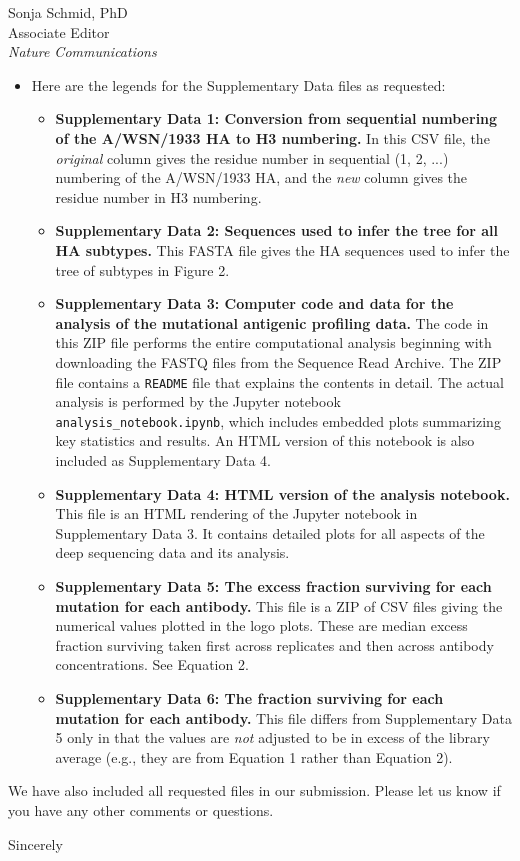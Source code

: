 \documentclass[a4paper,11pt]{letter}
\begin{document}
\begin{letter}{Sonja Schmid, PhD \\ Associate Editor \\ \textit{Nature Communications} }
\begin{itemize}
\item Here are the legends for the Supplementary Data files as requested:

\begin{itemize}

\item {\bf Supplementary Data 1: Conversion from sequential numbering of the A/WSN/1933 HA to H3 numbering.}
In this CSV file, the \emph{original} column gives the residue number in sequential (1, 2, ...) numbering of the A/WSN/1933 HA, and the \emph{new} column gives the residue number in H3 numbering.

\item {\bf Supplementary Data 2: Sequences used to infer the tree for all HA subtypes.}
This FASTA file gives the HA sequences used to infer the tree of subtypes in Figure 2.

\item {\bf Supplementary Data 3: Computer code and data for the analysis of the mutational antigenic profiling data.}
The code in this ZIP file performs the entire computational analysis beginning with downloading the FASTQ files from the Sequence Read Archive.
The ZIP file contains a \texttt{README} file that explains the contents in detail.
The actual analysis is performed by the Jupyter notebook \texttt{analysis\_notebook.ipynb}, which includes embedded plots summarizing key statistics and results.
An HTML version of this notebook is also included as Supplementary Data 4.

\item {\bf Supplementary Data 4: HTML version of the analysis notebook.}
This file is an HTML rendering of the Jupyter notebook in Supplementary Data 3.
It contains detailed plots for all aspects of the deep sequencing data and its analysis.

\item {\bf Supplementary Data 5: The excess fraction surviving for each mutation for each antibody.}
This file is a ZIP of CSV files giving the numerical values plotted in the logo plots.
These are median excess fraction surviving taken first across replicates and then across antibody concentrations.
See Equation 2.

\item {\bf Supplementary Data 6: The fraction surviving for each mutation for each antibody.}
This file differs from Supplementary Data 5 only in that the values are \emph{not} adjusted to be in excess of the library average (e.g., they are from Equation 1 rather than Equation 2).

\end{itemize}
\end{itemize}

We have also included all requested files in our submission.
Please let us know if you have any other comments or questions.

\closing{Sincerely} %

\end{letter}
\end{document}
